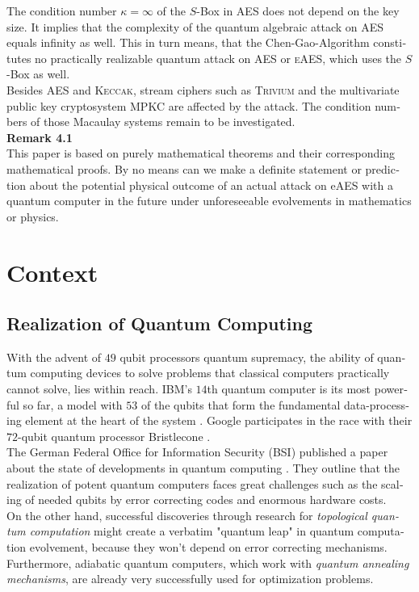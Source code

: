 \documentclass[a4paper,11pt]{article}
\begin{document}
\begin{otherlanguage}{english}
\noindent
The condition number $\kappa = \infty$ of the $S$-Box in \textsc{AES} does not depend on the key size. It implies that the complexity of the quantum algebraic attack on \textsc{AES} equals infinity as well. 
This in turn means, that the Chen-Gao-Algorithm constitutes no practically realizable quantum attack on \textsc{AES} or \textsc{eAES}, which uses the $S$-Box as well. \\

\noindent
Besides \textsc{AES} and \textsc{Keccak}, stream ciphers such as \textsc{Trivium} and the multivariate public key cryptosystem \textsc{MPKC} are affected by the attack. The condition numbers of those Macaulay systems remain to be investigated.\\

\noindent
\textbf{Remark 4.1} \\
This paper is based on purely mathematical theorems and their corresponding mathematical proofs. By no means can we make a definite statement or prediction about the potential physical outcome of an actual attack on eAES with a quantum computer in the future under unforeseeable evolvements in mathematics or physics. \\


\section{Context}

\subsection{Realization of Quantum Computing}

\noindent
With the advent of $49$ qubit processors quantum supremacy, the ability of quantum computing devices to solve problems that classical computers practically cannot solve,  lies within reach. IBM's $14$th quantum computer is its most powerful so far, a model with $53$ of the qubits that form the fundamental data-processing element at the heart of the system \cite{MSN}. Google participates in the race with their $72$-qubit quantum processor Bristlecone \cite{googleai}. \\

\noindent
The German Federal Office for Information Security (BSI) published a paper about the state of developments in quantum computing \cite{BSI}. They outline that the realization of potent quantum computers faces great challenges such as the scaling of needed qubits by error correcting codes and enormous hardware costs. \\
On the other hand, successful discoveries through research for \textit{topological quantum computation} \cite{TQB} might create a verbatim "quantum leap" in quantum computation evolvement, because they won't depend on error correcting mechanisms. Furthermore, adiabatic quantum computers, which work with \textit{quantum annealing mechanisms}, are already very successfully used for optimization problems.\\


\end{otherlanguage}
\end{document}
